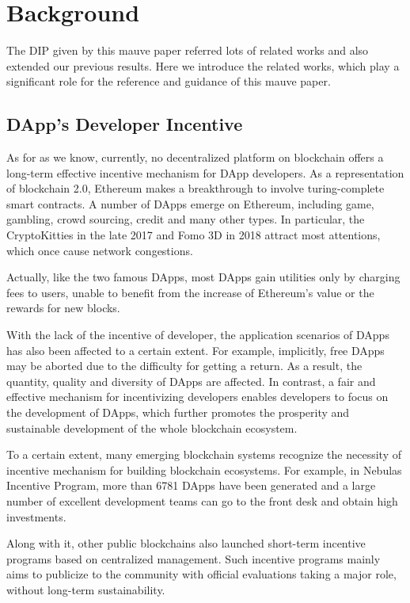 \section{Background}
\label{sec:background}
The DIP given by this mauve paper referred  lots of related works and also extended our previous results. Here we introduce the related works, which play a significant role for the  reference and guidance of this mauve paper.

\subsection{DApp's Developer Incentive}
As for as we know, currently, no decentralized platform on blockchain offers a long-term effective incentive mechanism for DApp developers. As a representation of blockchain 2.0, Ethereum makes a breakthrough to involve turing-complete smart contracts. A number of DApps emerge on Ethereum, including game, gambling, crowd sourcing, credit and many other types. In particular, the CryptoKitties in the late 2017 and Fomo 3D in 2018 attract most attentions, which once cause network congestions. 

Actually, like the two famous DApps, most DApps gain utilities only by charging fees to users, unable to benefit from the increase of Ethereum's value or the rewards for new blocks. 

With the lack of the incentive of developer, the application scenarios of DApps has also been affected to a certain extent. For example, implicitly, free DApps may be aborted due to the difficulty for getting a return. As a result, the quantity, quality and diversity of DApps are affected. In contrast, a fair and effective mechanism for incentivizing developers enables developers to focus on the development of DApps, which further promotes the prosperity and sustainable development of the whole blockchain ecosystem.

To a certain extent, many emerging blockchain systems recognize the necessity of incentive mechanism for building blockchain ecosystems. For example, in Nebulas Incentive Program, more than 6781 DApps have been generated and a large number of excellent development teams can go to the front desk and obtain high investments. 

Along with it, other public blockchains also launched short-term incentive programs based on centralized management. Such incentive programs mainly aims to publicize to the community with official evaluations taking a major role, without long-term sustainability.


